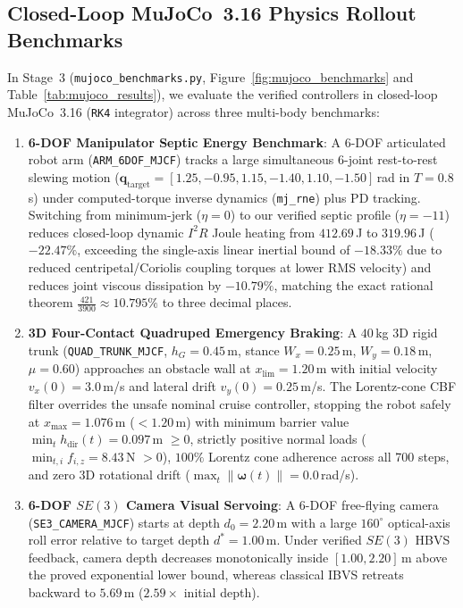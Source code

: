 \documentclass[10pt,twocolumn]{article}
\theoremstyle{definition}
\begin{document}
\subsection{Closed-Loop MuJoCo~3.16 Physics Rollout Benchmarks}
In Stage~3 (\texttt{mujoco\_benchmarks.py}, Figure~\ref{fig:mujoco_benchmarks} and Table~\ref{tab:mujoco_results}), we evaluate the verified controllers in closed-loop MuJoCo~3.16 (\texttt{RK4} integrator) across three multi-body benchmarks:
\begin{enumerate}[leftmargin=1.4em,itemsep=1pt]
  \item \textbf{6-DOF Manipulator Septic Energy Benchmark}: A 6-DOF articulated robot arm (\texttt{ARM\_6DOF\_MJCF}) tracks a large simultaneous 6-joint rest-to-rest slewing motion ($\mathbf{q}_{\text{target}} = [1.25, -0.95, 1.15, -1.40, 1.10, -1.50]\,$rad in $T = 0.8\,$s) under computed-torque inverse dynamics (\texttt{mj\_rne}) plus PD tracking. Switching from minimum-jerk ($\eta = 0$) to our verified septic profile ($\eta = -11$) reduces closed-loop dynamic $I^2R$ Joule heating from $412.69\,$J to $319.96\,$J (\textbf{$-22.47\%$}, exceeding the single-axis linear inertial bound of $-18.33\%$ due to reduced centripetal/Coriolis coupling torques at lower RMS velocity) and reduces joint viscous dissipation by \textbf{$-10.79\%$}, matching the exact rational theorem $\frac{421}{3900} \approx 10.795\%$ to three decimal places.
  \item \textbf{3D Four-Contact Quadruped Emergency Braking}: A $40\,$kg 3D rigid trunk (\texttt{QUAD\_TRUNK\_MJCF}, $h_G = 0.45\,$m, stance $W_x = 0.25\,$m, $W_y = 0.18\,$m, $\mu = 0.60$) approaches an obstacle wall at $x_{\text{lim}} = 1.20\,$m with initial velocity $v_x(0) = 3.0\,$m/s and lateral drift $v_y(0) = 0.25\,$m/s. The Lorentz-cone CBF filter overrides the unsafe nominal cruise controller, stopping the robot safely at $x_{\max} = 1.076\,$m ($< 1.20\,$m) with minimum barrier value $\min_t h_{\text{dir}}(t) = 0.097\,$m $\ge 0$, strictly positive normal loads ($\min_{t,i} f_{i,z} = 8.43\,$N $> 0$), $100\%$ Lorentz cone adherence across all 700 steps, and zero 3D rotational drift ($\max_t \|\boldsymbol{\omega}(t)\| = 0.0\,$rad/s).
  \item \textbf{6-DOF $SE(3)$ Camera Visual Servoing}: A 6-DOF free-flying camera (\texttt{SE3\_CAMERA\_MJCF}) starts at depth $d_0 = 2.20\,$m with a large $160^\circ$ optical-axis roll error relative to target depth $d^* = 1.00\,$m. Under verified $SE(3)$ HBVS feedback, camera depth decreases monotonically inside $[1.00, 2.20]\,$m above the proved exponential lower bound, whereas classical IBVS retreats backward to $5.69\,$m ($2.59\times$ initial depth).
\end{enumerate}
\end{document}
